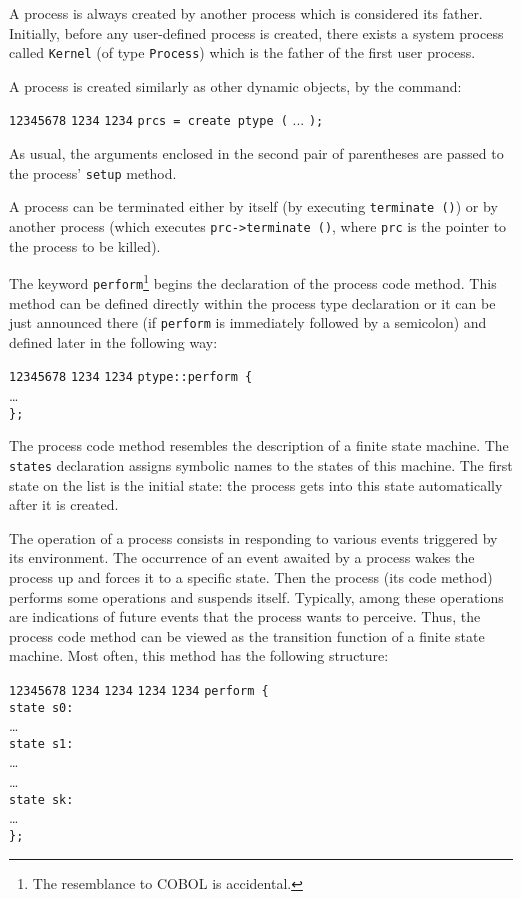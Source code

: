 A process is always created by another process which is considered its
father.
Initially, before any user-defined process is created, there exists a
system process called {\tt Kernel} (of type {\tt Process}) which is the
father of the first user process.

A process is created similarly as other dynamic objects, by the command:
{\small
\begin{tabbing}
{\tt 12345678} \= {\tt 1234} \= {\tt 1234} \kill
\> {\tt prcs = create ptype (} ... {\tt );}
\end{tabbing} }

As usual, the arguments enclosed in the second pair of parentheses are passed
to the process' {\tt setup} method.

A process can be terminated either by itself (by executing {\tt terminate~()})
or by another process (which executes {\tt prc->terminate~()}, where {\tt prc}
is the pointer to the process to be killed).

The keyword {\tt perform}\footnote{The resemblance to COBOL is
accidental.} begins the declaration of the process code method.
This method can be defined directly within the process type declaration or
it can be just announced there (if {\tt perform} is immediately followed
by a semicolon) and defined later in the following way:
{\small
\begin{tabbing}
{\tt 12345678} \= {\tt 1234} \= {\tt 1234} \kill
\> {\tt ptype::perform \{} \\
\> \> \ldots \\
\> {\tt \};}
\end{tabbing} }

The process code method resembles the description of a finite
state machine.
The {\tt states} declaration assigns symbolic names to the states of this
machine.
The first state on the list is the initial state: the process gets into this
state automatically after it is created.

The operation of a process consists in responding to various events triggered
by its environment.
The occurrence of an event awaited by a process wakes the process up and
forces it to a specific state.
Then the process (its code method) performs some operations and suspends
itself.
Typically, among these operations are indications of future
events that the process wants to perceive.
Thus, the process code method can be viewed as the transition function of
a finite state machine.
Most often, this method has the following structure:
{\small
\begin{tabbing}
{\tt 12345678} \= {\tt 1234} \= {\tt 1234} \= {\tt 1234} \= {\tt 1234} \kill
\> {\tt perform \{ } \\
\> \> {\tt state s0:} \\
\> \> \> \ldots \\
\> \> {\tt state s1:} \\
\> \> \> \ldots \\
\> \> \ldots \\
\> \> {\tt state sk:} \\
\> \> \> \ldots \\
\> {\tt \};}
\end{tabbing} }

